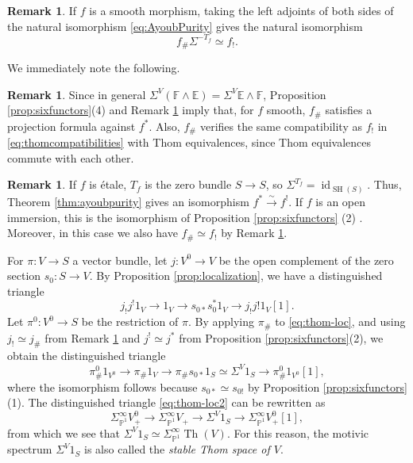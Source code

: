 \documentclass[10pt]{amsart}
\theoremstyle{definition}
\newtheorem{rmk}[defn]{Remark}
\theoremstyle{plain}
\numberwithin{equation}{section}
\newcommand{\0}{\emptyset}
\newcommand{\E}{{\mathbb E}}
\newcommand{\F}{{\mathbb F}}
\renewcommand{\P}{{\mathbb P}}
\newcommand{\SH}{{\operatorname{SH}}}
\newcommand{\Th}{{\operatorname{Th}}}
\newcommand{\id}{{\operatorname{id}}}
\begin{document}
\begin{rmk}
\label{rmk:smoothsharp}
If $f$ is a smooth morphism, taking the left adjoints of both sides of the natural isomorphism \eqref{eq:AyoubPurity} gives the natural isomorphism
$$f_\#\Sigma^{-T_f}\simeq f_!.$$
\end{rmk}

We immediately note the following.

\begin{rmk}
\label{rmk:smoothsharp-properties}
    Since in general $\Sigma^V(\F \wedge \E)=\Sigma^V\E \wedge \F$, Proposition \ref{prop:sixfunctors}(4) and Remark \ref{rmk:smoothsharp} imply that, for $f$ smooth, $f_\#$ satisfies a projection formula against $f^*$. Also, $f_{\#}$ verifies the same compatibility as $f_!$ in \eqref{eq:thomcompatibilities} with Thom equivalences, since Thom equivalences commute with each other.
\end{rmk}

\begin{rmk}
\label{rmk:etalemaps}
    If $f$ is étale, $T_f$ is the zero bundle $S \to S$, so $\Sigma^{T_f}=\id_{\SH(S)}$. Thus, Theorem \ref{thm:ayoubpurity} gives an isomorphism $f^* \xrightarrow{\sim} f^!$. If $f$ is an open immersion, this is the isomorphism of Proposition \ref{prop:sixfunctors} (2) . Moreover, in this case we also have $f_\# \simeq f_!$ by Remark \ref{rmk:smoothsharp}.
\end{rmk}

For $\pi:V \to S$ a vector bundle, let $j:V^0 \to V$ be the open complement of the zero section $s_0:S \to V$. By Proposition \ref{prop:localization}, we have a distinguished triangle 
\begin{equation}
\label{eq:thom-loc}
    j_!j^!1_V \to 1_V \to s_{0*}s_0^*1_V \to j_!j!1_V[1].
\end{equation}
Let $\pi^0:V^0 \to S$ be the restriction of $\pi$. By applying $\pi_\#$ to \eqref{eq:thom-loc}, and using $j_! \simeq j_\#$ from Remark \ref{rmk:etalemaps} and $j^! \simeq j^*$ from Proposition \ref{prop:sixfunctors}(2), we obtain the distinguished triangle
\begin{equation}
\label{eq:thom-loc2}
    \pi^0_\# 1_{V^0} \to \pi_\# 1_V \to \pi_\# s_{0*}1_S \simeq \Sigma^V 1_S \to \pi^0_\# 1_{V^0}[1],
\end{equation}
where the isomorphism follows because $s_{0*}\simeq s_{0!}$ by Proposition \ref{prop:sixfunctors}(1). The distinguished triangle \eqref{eq:thom-loc2} can be rewritten as
\begin{equation}
\label{eq:thom-loc3}
    \Sigma_{\P^1}^\infty V_+^0 \to \Sigma_{\P^1}^\infty V_+ \to \Sigma^V1_S \to \Sigma_{\P^1}^\infty V_+^0[1],
\end{equation}
from which we see that $\Sigma^V1_S \simeq \Sigma^\infty _{\P^1}\Th(V)$. For this reason, the motivic spectrum $\Sigma^V 1_S$ is also called the \emph{stable Thom space of $V$}.
\end{document}
